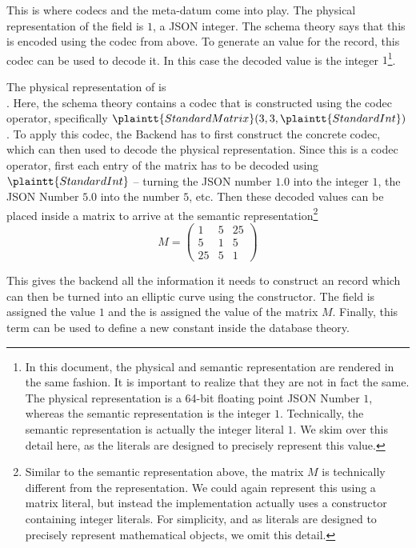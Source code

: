 This is where codecs and the  meta-datum come into play. 
The physical representation of the  field is $1$, a JSON integer. 
The schema theory says that this is encoded using the  codec from above. 
To generate an \mmt value for the record, this codec can be used to decode it. 
In this case the decoded value is the integer $1$\footnote{
  In this document, the physical and semantic representation are rendered in the same fashion. 
  It is important to realize that they are not in fact the same. 
  The physical representation is a 64-bit floating point JSON Number $1$, whereas the semantic representation is the integer $1$. 
  Technically, the semantic representation is actually the \ommt integer literal $1$. 
  We skim over this detail here, as the \ommt literals are designed to precisely represent this value. 
}. 

The physical representation of  is
\\\noindent\inlinecode{[[1.0,5.0,25.0],[5.0,1.0,5.0],[25.0,5.0,1.0]]}.  Here, the schema theory
contains a codec that is constructed using the  codec operator,
specifically $\plaintt{StandardMatrix}(3, 3,
\plaintt{StandardInt})$.  To apply this codec, the Backend has to first construct the
concrete codec, which can then used to decode the physical representation.  Since this is
a codec operator, first each entry of the matrix has to be decoded using
$\plaintt{StandardInt}$ -- turning the JSON number $1.0$ into the integer
$1$, the JSON Number $5.0$ into the number
$5$, etc.  Then these decoded values can be placed inside a matrix to arrive at the
semantic representation\footnote{Similar to the semantic representation above, the matrix
  $M$ is technically different from the \ommt representation.  We could again represent
  this using a matrix literal, but instead the implementation actually uses a constructor
  containing integer literals.  For simplicity, and as literals are designed to precisely
  represent mathematical objects, we omit this detail.  } 
\[M = \left( \begin{array}{ccc}
               1 & 5 & 25 \\
               5 & 1 & 5 \\
               25 & 5 & 1 
             \end{array}
           \right)
\]

This gives the backend all the information it needs to construct an \mmt record which can
then be turned into an elliptic curve using the  constructor.
The  field is assigned the value
$1$ and the  is assigned the value of the matrix $M$.  Finally,
this \mmt term can be used to define a new constant inside the database theory.



